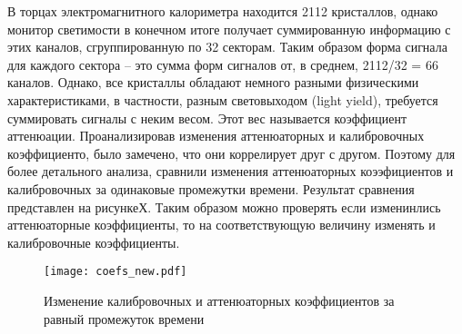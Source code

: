   В торцах электромагнитного калориметра находится 2112 кристаллов, однако монитор светимости в конечном итоге получает суммированную информацию с этих каналов, сгруппированную по 32 секторам. Таким образом форма сигнала для каждого сектора -- это сумма форм сигналов от, в среднем, 2112/32 = 66 каналов. Однако, все кристаллы обладают немного разными физическими характеристиками, в частности, разным световыходом (light yield), требуется суммировать сигналы с неким весом. Этот вес называется коэффициент аттенюации. Проанализировав изменения аттенюаторных и калибровочных коэффициенто, было замечено, что они коррелирует друг с другом. Поэтому для более детального анализа, сравнили изменения аттенюаторных коээфициентов и калибровочных за одинаковые промежутки времени. Результат сравнения представлен на рисункеХ. Таким образом можно проверять если изменинлись аттенюаторные коэффициенты, то на соответствующую величину изменять и калибровочные коэффициенты.
\newpage
\begin{figure}[htp]
  \centering
  \texttt{[image: coefs\_new.pdf]}
  \caption{Изменение калибровочных и аттенюаторных коэффициентов за равный промежуток времени}
  \label{fig:galaxy}
\end{figure}
